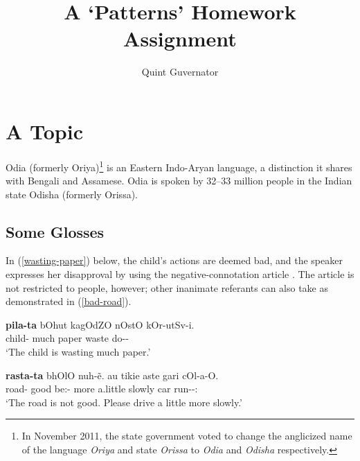 \documentclass[letterpaper,11pt]{article}
\title{\huge\bf A `Patterns' Homework Assignment}
\author{Quint Guvernator}
\newcommand{\ipa}[1]{\textit{\textipa{#1}}}
\newcommand{\rex}[1]{(\ref{#1})}
\begin{document}
\maketitle
\doublespacing

\section{A Topic}

Odia (formerly Oriya)\footnote{
  In November 2011, the state government voted to change the anglicized name of the language \emph{Oriya} and state \emph{Orissa} to \emph{Odia} and \emph{Odisha} respectively.
}
is an Eastern Indo-Aryan language, a distinction it shares with Bengali and Assamese. Odia is spoken by 32--33 million people in the Indian state Odisha (formerly Orissa).

\subsection{Some Glosses}

In \rex{wasting-paper} below, the child's actions are deemed bad, and the speaker expresses her disapproval by using the negative-connotation article \ipa{-\:ta}.
The article is not restricted to people, however; other inanimate referants can also take \ipa{-\:ta} as demonstrated in \rex{bad-road}.

\begin{exe}
  \ex \label{wasting-paper}
  \gll \textbf{pila-\:ta} bOhut kagOdZO nOstO kOr-utSv-i.
  \\ child-\Art{} much paper waste do-\Prog-\Third\Sg
  \\ \trans `The child is wasting much paper.'

  \ex \label{bad-road}
  \gll \textbf{rasta-\:ta} bhOlO nuh-\~e. au \:tikie aste ga\:ri cO\:l-a-O.
  \\ road-\Art{} good be:\Neg-\Third\Sg{} more a.little slowly car run-\Caus-\Second\Pl:\Imp
  \\ \trans `The road is not good. Please drive a little more slowly.'
\end{exe}

{}

\end{document}
